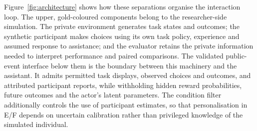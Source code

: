 \documentclass[11pt,a4paper]{article}
\begin{document}
Figure~\ref{fig:architecture} shows how these separations organise the interaction loop. The upper, gold-coloured components belong to the researcher-side simulation. The private environment generates task states and outcomes; the synthetic participant makes choices using its own task policy, experience and assumed response to assistance; and the evaluator retains the private information needed to interpret performance and paired comparisons. The validated public-event interface below them is the boundary between this machinery and the assistant. It admits permitted task displays, observed choices and outcomes, and attributed participant reports, while withholding hidden reward probabilities, future outcomes and the actor's latent parameters. The condition filter additionally controls the use of participant estimates, so that personalisation in E/F depends on uncertain calibration rather than privileged knowledge of the simulated individual.
\end{document}
